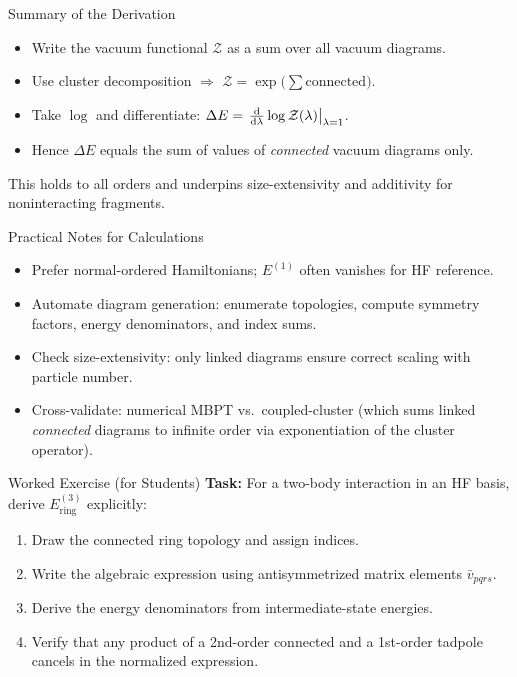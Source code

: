 \documentclass[aspectratio=169,11pt]{beamer}
\newcommand{\Z}{\mathcal{Z}}
\begin{document}
\begin{frame}{Summary of the Derivation}
\begin{itemize}
  \item Write the vacuum functional $\Z$ as a sum over all vacuum diagrams.
  \item Use cluster decomposition $\Rightarrow$ $\Z=\exp\big(\sum \text{connected}\big)$.
  \item Take $\log$ and differentiate: $\Delta E = \eval{\dv{\lambda}\log \Z(\lambda)}_{\lambda=1}$.
  \item Hence $\Delta E$ equals the sum of values of \emph{connected} vacuum diagrams only.
\end{itemize}
This holds to all orders and underpins size-extensivity and additivity for noninteracting fragments.
\end{frame}

\begin{frame}{Practical Notes for Calculations}
\begin{itemize}
  \item Prefer normal-ordered Hamiltonians; $E^{(1)}$ often vanishes for HF reference.
  \item Automate diagram generation: enumerate topologies, compute symmetry factors, energy denominators, and index sums.
  \item Check size-extensivity: only linked diagrams ensure correct scaling with particle number.
  \item Cross-validate: numerical MBPT vs.\ coupled-cluster (which sums linked \emph{connected} diagrams to infinite order via exponentiation of the cluster operator).
\end{itemize}
\end{frame}

\begin{frame}{Worked Exercise (for Students)}
\textbf{Task:} For a two-body interaction in an HF basis, derive $E^{(3)}_{\text{ring}}$ explicitly:
\begin{enumerate}
  \item Draw the connected ring topology and assign indices.
  \item Write the algebraic expression using antisymmetrized matrix elements $\bar{v}_{pqrs}$.
  \item Derive the energy denominators from intermediate-state energies.
  \item Verify that any product of a 2nd-order connected and a 1st-order tadpole cancels in the normalized expression.
\end{enumerate}
\end{frame}
\end{document}
